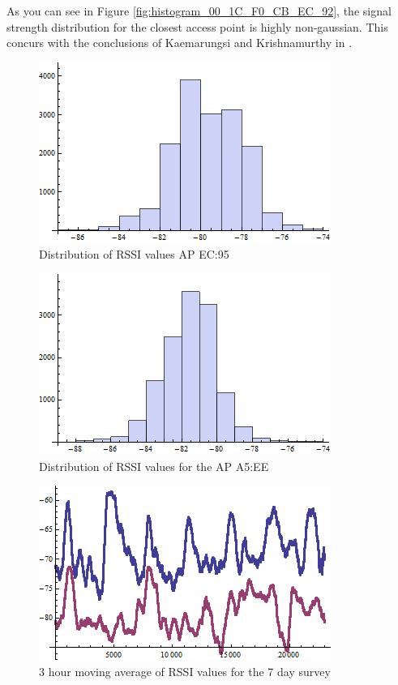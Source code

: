 As you can see in Figure \ref{fig:histogram_00_1C_F0_CB_EC_92}, the signal 
strength distribution for the closest access point is highly non-gaussian. This
concurs with the conclusions of Kaemarungsi and Krishnamurthy in \cite{KStats}.

\begin{figure}\centering
    \includegraphics{figures/histogram_00_1C_F0_CB_EC_95.png}
    \caption{Distribution of RSSI values AP EC:95\label{fig:histogram_00_1C_F0_CB_EC_95}}
\end{figure}

\begin{figure}\centering
    \includegraphics{figures/histogram_00_19_5B_77_A5_EE.png}
    \caption{Distribution of RSSI values for the AP A5:EE\label{fig:histogram_00_19_5B_77_A5_EE}}
\end{figure}


\begin{figure}\centering
    \includegraphics{figures/moving_average.png}
    \caption{3 hour moving average of RSSI values for the 7 day survey\label{fig:moving_average}}
\end{figure}

